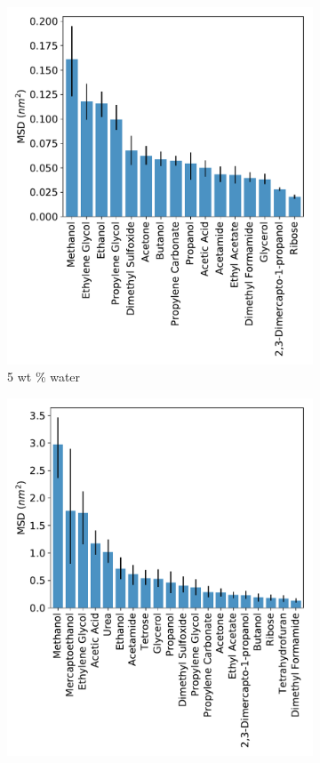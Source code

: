 \documentclass{article}
\begin{document}
  \begin{figure}
  \centering
  \begin{subfigure}{0.45\textwidth}
  \includegraphics[width=\textwidth]{all_5wt_tamsds.pdf}
  \caption{5 wt \% water}\label{fig:all_msds_5wt}
  \end{subfigure}
  \begin{subfigure}{0.45\textwidth}
  \includegraphics[width=\textwidth]{all_10wt_tamsds.pdf}

\end{subfigure}
\end{figure}
\end{document}
